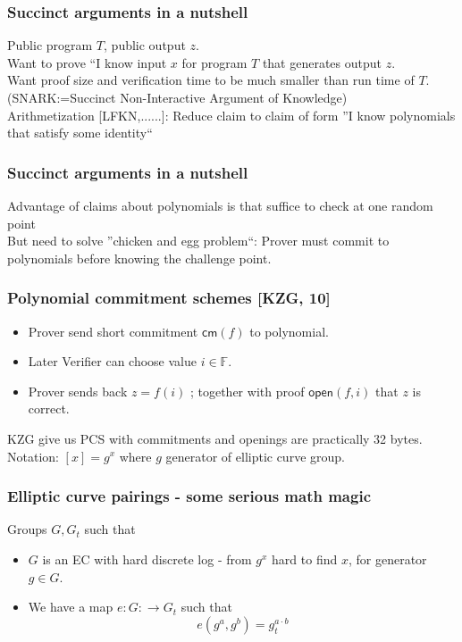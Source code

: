 \documentclass[shadesubsections,compress,14pt,mathserif]{beamer}
\newcommand{\F}{\ensuremath{\mathbb F}}
\newcommand{\enc}[1]{\ensuremath{\left[#1\right ]}}
\newcommand{\cm}{\ensuremath{\mathsf{cm}}}
\newcommand{\open}[1]{\ensuremath{\mathsf{open}(#1)}}
\begin{document}
\begin{frame}
 \frametitle{Succinct arguments in a nutshell}   %
 Public program $T$, public output $z$.\\ \pause
 \vspace{0.4in}
 Want to prove ``I know input $x$ for program $T$ that generates output $z$.\\ \pause
 \vspace{0.4in}
Want proof size and verification time to be much smaller than run time of $T$. \\ 
{\small (SNARK:=Succinct Non-Interactive Argument of Knowledge)}\\ \pause
 \vspace{0.4in}
 Arithmetization {\small [LFKN,......]}: Reduce claim to claim of form ''I know polynomials that satisfy some identity`` \pause
\end{frame}
\begin{frame}
 \frametitle{Succinct arguments in a nutshell}   %
 Advantage of claims about polynomials is that suffice to check at one random point \\ \pause
 \vspace{0.4in}
 But need to solve ''chicken and egg problem``: Prover must commit to polynomials before knowing the challenge point. 
 \vspace{0.4in}
 
\end{frame}
\begin{frame}
 \frametitle{Polynomial commitment schemes {\small [KZG, 10]}}   %
\begin{itemize}
 \item Prover send short commitment $\cm(f)$ to polynomial.\pause
 \item Later Verifier can choose value $i\in \F$.\pause
 \item Prover sends back $z=f(i)$ ; together with proof $\open{f,i}$ that $z$ is correct.\pause
\end{itemize}
KZG give us PCS with commitments and openings are practically 32 bytes.\\ 
Notation: $\enc{x}=g^x$ where $g$ generator of elliptic curve group.
\end{frame}


\begin{frame}
 \frametitle{Elliptic curve pairings - some serious math magic}
 Groups $G,G_t$
 such that
 \begin{itemize}
  \item $G$ is an EC with hard discrete log - from $g^x$ hard to find $x$, for generator $g\in G$.\pause %
  \item We have a map $e:G:\rightarrow G_t$ such that
  \[e( g^a, g^b) = g_t^{a\cdot b}\]
  
 \end{itemize}

\end{frame}
\end{document}
